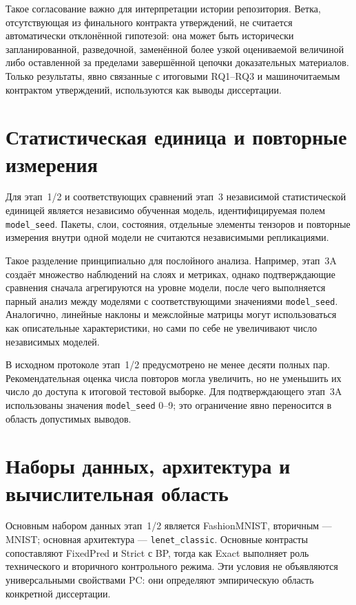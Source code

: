 Такое согласование важно для интерпретации истории репозитория. Ветка,
отсутствующая из финального контракта утверждений, не считается автоматически
отклонённой гипотезой: она может быть исторически запланированной, разведочной,
заменённой более узкой оцениваемой величиной либо оставленной за пределами
завершённой цепочки доказательных материалов. Только результаты, явно связанные
с итоговыми RQ1--RQ3 и машиночитаемым контрактом утверждений, используются как
выводы диссертации.

\section{Статистическая единица и повторные измерения}
\label{sec:method-stat-unit}

Для этап~1/2 и соответствующих сравнений этап~3 независимой статистической
единицей является независимо обученная модель, идентифицируемая полем
\texttt{model\_seed}. Пакеты, слои, состояния, отдельные элементы тензоров и
повторные измерения внутри одной модели не считаются независимыми
репликациями.

Такое разделение принципиально для послойного анализа. Например, этап~3A
создаёт множество наблюдений на слоях и метриках, однако подтверждающие
сравнения сначала агрегируются на уровне модели, после чего выполняется парный
анализ между моделями с соответствующими значениями \texttt{model\_seed}.
Аналогично, линейные наклоны и межслойные матрицы могут использоваться как
описательные характеристики, но сами по себе не увеличивают число независимых
моделей.

В исходном протоколе этап~1/2 предусмотрено не менее десяти полных пар.
Рекомендательная оценка числа повторов могла увеличить, но не уменьшить их
число до доступа к итоговой тестовой выборке. Для подтверждающего этап~3A
использованы значения \texttt{model\_seed} 0--9; это ограничение явно
переносится в область допустимых выводов.

\section{Наборы данных, архитектура и вычислительная область}

Основным набором данных этап~1/2 является FashionMNIST, вторичным --- MNIST;
основная архитектура --- \texttt{lenet\_classic}. Основные контрасты
сопоставляют FixedPred и Strict с BP, тогда как Exact выполняет роль
технического и вторичного контрольного режима. Эти условия не объявляются
универсальными свойствами PC: они определяют эмпирическую область конкретной
диссертации.

